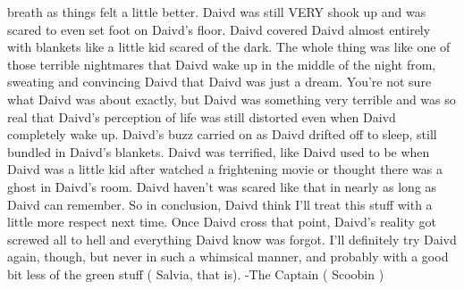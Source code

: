 \documentclass[12pt]{book}
\begin{document}
breath as things felt a little better. Daivd was still VERY shook up and was scared to even set foot on Daivd's floor. Daivd covered Daivd almost entirely with blankets like a little kid scared of the dark. The whole thing was like one of those terrible nightmares that Daivd wake up in the middle of the night from, sweating and convincing Daivd that Daivd was just a dream. You're not sure what Daivd was about exactly, but Daivd was something very terrible and was so real that Daivd's perception of life was still distorted even when Daivd completely wake up. Daivd's buzz carried on as Daivd drifted off to sleep, still bundled in Daivd's blankets. Daivd was terrified, like Daivd used to be when Daivd was a little kid after watched a frightening movie or thought there was a ghost in Daivd's room. Daivd haven't was scared like that in nearly as long as Daivd can remember. So in conclusion, Daivd think I'll treat this stuff with a little more respect next time. Once Daivd cross that point, Daivd's reality got screwed all to hell and everything Daivd know was forgot. I'll definitely try Daivd again, though, but never in such a whimsical manner, and probably with a good bit less of the green stuff ( Salvia, that is). -The Captain ( Scoobin )
\end{document}

